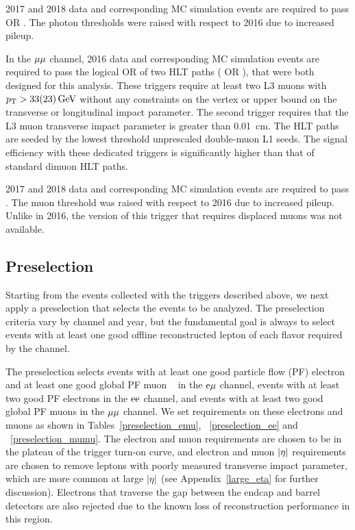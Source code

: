 2017 and 2018 data and corresponding MC simulation events are required to pass  OR  . The photon \ET thresholds were raised with respect to 2016 due to increased pileup.

In the ${\mu}{\mu}$ channel, 2016 data and corresponding MC simulation events are required to pass the logical OR of two HLT paths ( OR ), that were both designed for this analysis. These triggers require at least two L3 muons with $p_{\mathrm{T}}>33(23)\,\text{Ge\hspace{-.08em}V}$ without any constraints on the vertex or upper bound on the transverse or longitudinal impact parameter. The second trigger requires that the L3 muon transverse impact parameter is greater than 0.01~\unit{cm}. The HLT paths are seeded by the lowest \pt threshold unprescaled double-muon L1 seeds. The signal efficiency with these dedicated triggers is significantly higher than that of standard dimuon HLT paths.

2017 and 2018 data and corresponding MC simulation events are required to pass . The muon \pt threshold was raised with respect to 2016 due to increased pileup. Unlike in 2016, the version of this trigger that requires displaced muons was not available.


\subsection{Preselection}
\label{preselection}
Starting from the events collected with the triggers described above, we next apply a preselection that selects the events to be analyzed. The preselection criteria vary by channel and year, but the fundamental goal is always to select events with at least one good offline reconstructed lepton of each flavor required by the channel. 

The preselection selects events with at least one good particle flow (PF) electron and at least one good global PF muon ~\cite{cms_pf} in the $\mathrm{e}{\mu}$ channel, events with at least two good PF electrons in the $\mathrm{e}\mathrm{e}$ channel, and events with at least two good global PF muons in the ${\mu}{\mu}$ channel.  We set requirements on these electrons and muons as shown in Tables~\ref{preselection_emu}, ~\ref{preselection_ee} and ~\ref{preselection_mumu}. The electron and muon \pt  requirements are chosen to be in the plateau of the trigger turn-on curve, and electron and muon $\lvert \eta \rvert$ requirements are chosen to remove leptons with poorly measured transverse impact parameter, which are more common at large $\lvert \eta \rvert$ (see Appendix~\ref{large_eta} for further discussion). Electrons that traverse the gap between the endcap and barrel detectors are also rejected due to the known loss of reconstruction performance in this region.

